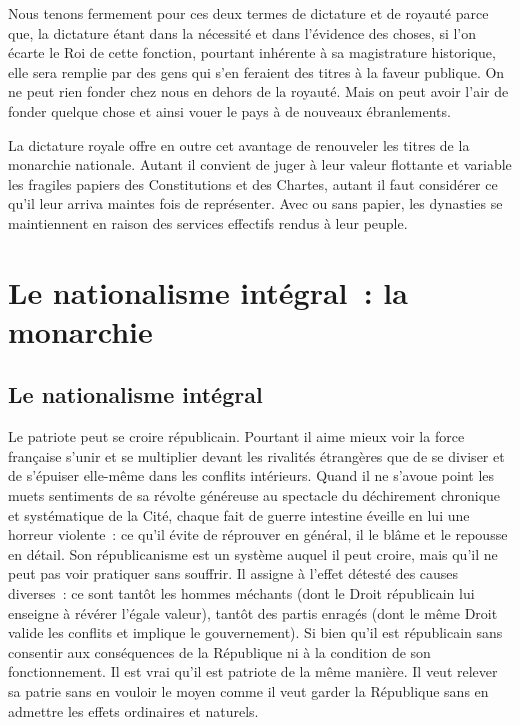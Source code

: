 \documentclass[french,twoside]{book} %
\newcommand{\astermono}{\medskip\centerline{\color{rubric}\large\selectfont{\syms ✻}}\medskip\par}%
\begin{document}
\astermono

\noindent Nous tenons fermement pour ces deux termes de dictature et de royauté parce que, la dictature étant dans la nécessité et dans l’évidence des choses, si l’on écarte le Roi de cette fonction, pourtant inhérente à sa magistrature historique, elle sera remplie par des gens qui s’en feraient des titres à la faveur publique. On ne peut rien fonder chez nous en dehors de la royauté. Mais on peut avoir l’air de fonder quelque chose et ainsi vouer le pays à de nouveaux ébranlements.\par
La dictature royale offre en outre cet avantage de renouveler les titres de la monarchie nationale. Autant il convient de juger à leur valeur flottante et variable les fragiles papiers des Constitutions et des Chartes, autant il faut considérer ce qu’il leur arriva maintes fois de représenter. Avec ou sans papier, les dynasties se maintiennent en raison des services effectifs rendus à leur peuple.
\section[{Le nationalisme intégral : la monarchie}]{Le nationalisme intégral : la monarchie}
\subsection[{Le nationalisme intégral}]{Le nationalisme intégral}
\noindent Le patriote peut se croire républicain. Pourtant il aime mieux voir la force française s’unir et se multiplier devant les rivalités étrangères que de se diviser et de s’épuiser elle-même dans les conflits intérieurs. Quand il ne s’avoue point les muets sentiments de sa révolte généreuse au spectacle du déchirement chronique et systématique de la Cité, chaque fait de guerre intestine éveille en lui une horreur violente : ce qu’il évite de réprouver en général, il le blâme et le repousse en détail. Son républicanisme est un système auquel il peut croire, mais qu’il ne peut pas voir pratiquer sans souffrir. Il assigne à l’effet détesté des causes diverses : ce sont tantôt les hommes méchants (dont le Droit républicain lui enseigne à révérer l’égale valeur), tantôt des partis enragés (dont le même Droit valide les conflits et implique le gouvernement). Si bien qu’il est républicain sans consentir aux conséquences de la République ni à la condition de son fonctionnement. Il est vrai qu’il est patriote de la même manière. Il veut relever sa patrie sans en vouloir le moyen comme il veut garder la République sans en admettre les effets ordinaires et naturels.\par
\end{document}

